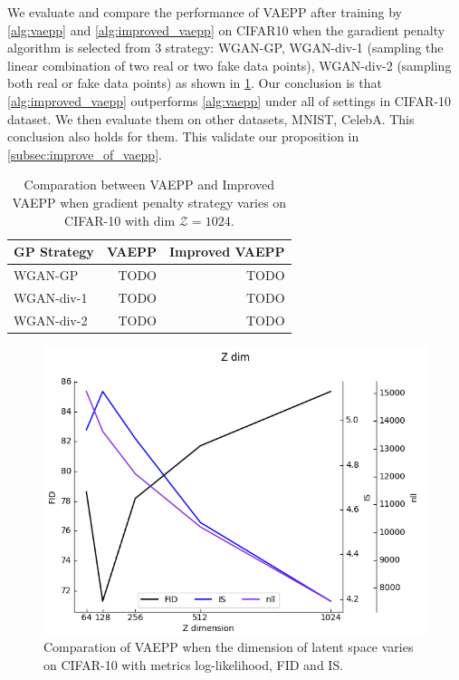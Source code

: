 We evaluate and compare the performance of VAEPP after training by \cref{alg:vaepp} and \cref{alg:improved_vaepp} on CIFAR10 when the garadient penalty algorithm is selected from 3 strategy: WGAN-GP, WGAN-div-1  (sampling the linear combination of two real or two fake data points), WGAN-div-2 (sampling both real or fake data points) as shown in \cref{tab:compare_nD_over_R}. Our conclusion is that \cref{alg:improved_vaepp} outperforms \cref{alg:vaepp} under all of settings in CIFAR-10 dataset. We then evaluate them on other datasets, MNIST, CelebA. This conclusion also holds for them. This validate our proposition in \cref{subsec:improve_of_vaepp}. 
\begin{table}[tb]
\centering
\begin{tabular}{lrr}  
\toprule
GP Strategy  &  VAEPP  &  Improved VAEPP \\
\midrule
WGAN-GP            &  TODO   & TODO      \\
WGAN-div-1         &  TODO   & TODO      \\
WGAN-div-2         &  TODO   & TODO      \\
\bottomrule
\end{tabular}
\caption{Comparation between VAEPP and Improved VAEPP when gradient penalty strategy varies on CIFAR-10 with dim $\mathcal{Z} = 1024$. }
\label{tab:compare_nD_over_R}
\end{table}

\begin{figure}
	\centering
	\includegraphics[width=\columnwidth]{../figures/fid_is_nll_on_different_dim}
	\caption{
	Comparation of VAEPP when the dimension of latent space varies on CIFAR-10 with metrics log-likelihood, FID and IS.
	}
	\label{fig:compare_nD_over_z_dim}
\end{figure}

